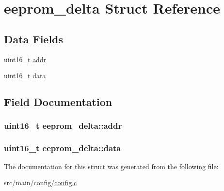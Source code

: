 \hypertarget{structeeprom__delta}{\section{eeprom\+\_\+delta Struct Reference}
\label{structeeprom__delta}
}
\subsection*{Data Fields}
\begin{DoxyCompactItemize}
\item 
uint16\+\_\+t \hyperlink{structeeprom__delta_abfa4da860f5e3e6e821be527d27dcee5}{addr}
\item 
uint16\+\_\+t \hyperlink{structeeprom__delta_a7f34ebde3c37c38fb9948214a6963ca9}{data}
\end{DoxyCompactItemize}


\subsection{Field Documentation}
\hypertarget{structeeprom__delta_abfa4da860f5e3e6e821be527d27dcee5}{
\subsubsection[{addr}]{\setlength{\rightskip}{0pt plus 5cm}uint16\+\_\+t eeprom\+\_\+delta\+::addr}}\label{structeeprom__delta_abfa4da860f5e3e6e821be527d27dcee5}
\hypertarget{structeeprom__delta_a7f34ebde3c37c38fb9948214a6963ca9}{
\subsubsection[{data}]{\setlength{\rightskip}{0pt plus 5cm}uint16\+\_\+t eeprom\+\_\+delta\+::data}}\label{structeeprom__delta_a7f34ebde3c37c38fb9948214a6963ca9}


The documentation for this struct was generated from the following file\+:\begin{DoxyCompactItemize}
\item 
src/main/config/\hyperlink{config_8c}{config.\+c}\end{DoxyCompactItemize}
